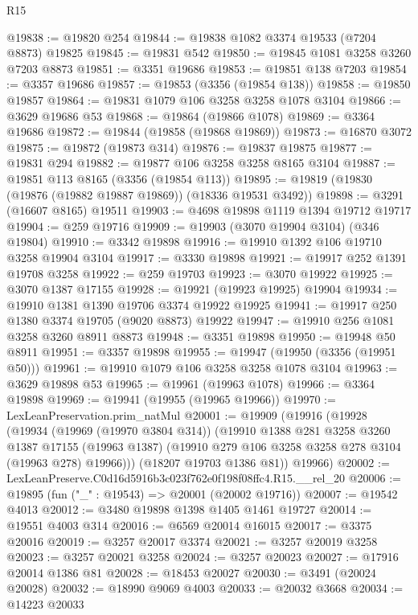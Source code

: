 \begin{lexlean}{R15}
\begin{coremodule}
@19838 := @19820 @254
@19844 := @19838 @1082 @3374 @19533 (@7204 @8873) @19825
@19845 := @19831 @542
@19850 := @19845 @1081 @3258 @3260 @7203 @8873
@19851 := @3351 @19686
@19853 := @19851 @138 @7203
@19854 := @3357 @19686
@19857 := @19853 (@3356 (@19854 @138))
@19858 := @19850 @19857
@19864 := @19831 @1079 @106 @3258 @3258 @1078 @3104
@19866 := @3629 @19686 @53
@19868 := @19864 (@19866 @1078)
@19869 := @3364 @19686
@19872 := @19844 (@19858 (@19868 @19869))
@19873 := @16870 @3072
@19875 := @19872 (@19873 @314)
@19876 := @19837 @19875
@19877 := @19831 @294
@19882 := @19877 @106 @3258 @3258 @8165 @3104
@19887 := @19851 @113 @8165 (@3356 (@19854 @113))
@19895 := @19819 (@19830 (@19876 (@19882 @19887 @19869)) (@18336 @19531 @3492))
@19898 := @3291 (@16607 @8165) @19511
@19903 := @4698 @19898 @1119 @1394 @19712 @19717
@19904 := @259 @19716
@19909 := @19903 (@3070 @19904 @3104) (@346 @19804)
@19910 := @3342 @19898
@19916 := @19910 @1392 @106 @19710 @3258 @19904 @3104
@19917 := @3330 @19898
@19921 := @19917 @252 @1391 @19708 @3258
@19922 := @259 @19703
@19923 := @3070 @19922
@19925 := @3070 @1387 @17155
@19928 := @19921 (@19923 @19925) @19904
@19934 := @19910 @1381 @1390 @19706 @3374 @19922 @19925
@19941 := @19917 @250 @1380 @3374 @19705 (@9020 @8873) @19922
@19947 := @19910 @256 @1081 @3258 @3260 @8911 @8873
@19948 := @3351 @19898
@19950 := @19948 @50 @8911
@19951 := @3357 @19898
@19955 := @19947 (@19950 (@3356 (@19951 @50)))
@19961 := @19910 @1079 @106 @3258 @3258 @1078 @3104
@19963 := @3629 @19898 @53
@19965 := @19961 (@19963 @1078)
@19966 := @3364 @19898
@19969 := @19941 (@19955 (@19965 @19966))
@19970 := LexLeanPreservation.prim_natMul
@20001 := @19909
    (@19916
      (@19928
        (@19934
          (@19969 (@19970 @3804 @314))
          (@19910
            @1388
            @281
            @3258
            @3260
            @1387
            @17155
            (@19963 @1387)
            (@19910 @279 @106 @3258 @3258 @278 @3104 (@19963 @278) @19966)))
        (@18207 @19703 @1386 @81))
      @19966)
@20002 := LexLeanPreserve.C0d16d5916b3c023f762e0f198f08ffc4.R15.__rel_20
@20006 := @19895 (fun ("_" : @19543) => @20001 (@20002 @19716))
@20007 := @19542 @4013
@20012 := @3480 @19898 @1398 @1405 @1461 @19727
@20014 := @19551 @4003 @314
@20016 := @6569 @20014 @16015
@20017 := @3375 @20016
@20019 := @3257 @20017 @3374
@20021 := @3257 @20019 @3258
@20023 := @3257 @20021 @3258
@20024 := @3257 @20023
@20027 := @17916 @20014 @1386 @81
@20028 := @18453 @20027
@20030 := @3491 (@20024 @20028)
@20032 := @18990 @9069 @4003
@20033 := @20032 @3668
@20034 := @14223 @20033

\end{coremodule}
\end{lexlean}
